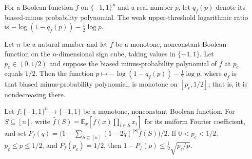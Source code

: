 \begin{definition}
\label{FABL.weakUpperThresholdLogRatio}
\leanok
{}
For a Boolean function $f$ on $
\{−1,1\}^n$ and a real number $p$, let $q_f(p)$ denote its biased-minus probability
polynomial. The weak upper-threshold logarithmic ratio is $-\log(1-q_f(p)) -
\tfrac12\log p$.
\end{definition}

\begin{theorem}
\label{FABL.weakUpperThresholdLogRatio_monotoneOn}
\leanok
{}
Let $n$ be a natural number and let $f$ be a monotone, nonconstant Boolean function on
the $n$-dimensional sign cube, taking values in $\{-1,1\}$. Let $p_c\in(0,1/2)$ and
suppose the biased minus-probability polynomial of $f$ at $p_c$ equals $1/2$. Then the
function $p\mapsto-\log(1-q_f(p))-\tfrac12\log p$, where $q_f$ is that biased
minus-probability polynomial, is monotone on $[p_c,1/2]$; that is, it is nondecreasing
there.
\end{theorem}

\begin{theorem}
\label{FABL.one_sub_biasedMinusProbabilityPolynomial_le_half_mul_sqrt_critical_div}
\leanok
{}
Let $f:\{-1,1\}^n\to\{-1,1\}$ be a monotone, nonconstant Boolean function. For
$S\subseteq[n]$, write $\widehat f(S)=\mathbb E_x[f(x)\prod_{i\in S}x_i]$ for its
uniform Fourier coefficient, and set
$P_f(q)=\bigl(1-\sum_{S\subseteq[n]}(1-2q)^{|S|}\widehat f(S)\bigr)/2$. If
$0<p_c<1/2$, $p_c\le p\le1/2$, and $P_f(p_c)=1/2$, then
$1-P_f(p)\le\frac12\sqrt{p_c/p}$.
\end{theorem}

